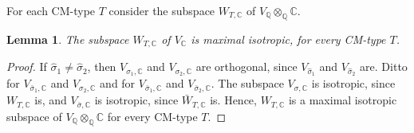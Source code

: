 \documentclass[12pt]{amsart}
\newcommand{\hide}[1]{}
\numberwithin{equation}{subsection}
\theoremstyle{plain}
\newtheorem{lem}[thm]{Lemma}
\theoremstyle{definition}
\newcommand{\CC}{{\mathbb C}}
\newcommand{\QQ}{{\mathbb Q}}
\newcommand{\RightArrowOf}[1]{\stackrel{#1}{\rightarrow}}
\newcommand{\LongRightArrowOf}[1]{\stackrel{#1}{\longrightarrow}}
\begin{document}
{%
\hide{
For each CM-type $T'$ we define the subspace $\tilde{W}_{T'}$ of $V_\QQ\otimes_\QQ K$ (not $V_{\hat{\eta},K}$) as the
direct sum  
\[
\tilde{W}_{T'}:= \oplus_{\sigma\in T'}V_\sigma.
\] 
We define the subspace $W_{T'}$ of $V_{\hat{\eta},K}$ as the image of $\tilde{W}_{T'}$ via the natural homomorphism 
\begin{equation}
\label{eq-mapping-tilde-W-T-to-W-T}
V_\QQ\otimes_\QQ K
\rightarrow V_\QQ\otimes_F K=:V_{\hat{\eta},K}
\end{equation}
mapping $v\otimes(f_1+f_2\sqrt{-q})$ to $\hat{\eta}_{f_1}(v)+\hat{\eta}_{f_2}(v)\otimes\sqrt{-q}$, for all $v\in V_\QQ$ and $f_1, f_2\in F$.
(??? Check that for the originally chosen CM-type $T$ we do get the previously defined $W_T$. Note that $\dim_\QQ(V_\sigma)=\dim_\QQ(V_\QQ)=\dim_\QQ(W_T)$. We may need to change the definition and consider instead the image of $V_\QQ$ via its diagonal embedding into $\tilde{W}_{T'}$ and map it to $V_{\hat{\eta},K}$ via (\ref{eq-mapping-tilde-W-T-to-W-T})???)
(??? 
Is $\tilde{W}_T$ isotropic? If indeed it is, what is its pure spinor and how is it related to that of $W_T$?   ???)
}

For each CM-type $T$ 
consider the subspace $W_{T,\CC}$ of
$V_\QQ\otimes_\QQ\CC$.

\begin{lem}
\label{lemma-W-T-is-maximal-isotropic}
The subspace $W_{T,\CC}$ of $V_\CC$ is maximal isotropic, for every CM-type $T$.
\end{lem}

\begin{proof}
If $\hat{\sigma}_1\neq \hat{\sigma}_2$, then $V_{\sigma_1,\CC}$ and $V_{\sigma_2,\CC}$ are orthogonal, since $V_{\hat{\sigma}_1}$ and $V_{\hat{\sigma}_2}$ are.
Ditto for $V_{\bar{\sigma}_1,\CC}$ and $V_{\sigma_2,\CC}$ and for  $V_{\bar{\sigma}_1,\CC}$ and $V_{\bar{\sigma}_2,\CC}$. The subspace 
$V_{\sigma,\CC}$ is isotropic, since $W_{T,\CC}$ is, and $V_{\bar{\sigma},\CC}$ is isotropic, since $\bar{W}_{T,\CC}$ is.
Hence, $W_{T,\CC}$ is  a maximal isotropic subspace of 
$V_\QQ\otimes_\QQ\CC$
for every CM-type $T$.  
\end{proof}

}
\end{document}
